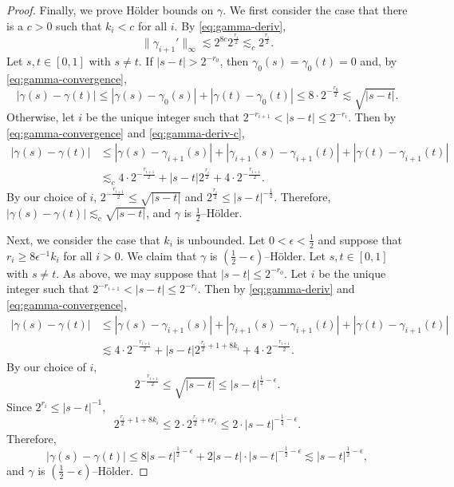 \documentclass[12pt,reqno]{amsart}
\theoremstyle{remark}
\newcommand{\0}{\mathbf{0}}
\renewcommand{\1}{\mathbf 1}
\begin{document}
\begin{proof}
  Finally, we prove Hölder bounds on $\gamma$. We first consider the case that there is a $c>0$ such that $k_i< c$ for all $i$. By \eqref{eq:gamma-deriv},
  \begin{equation}\label{eq:gamma-deriv-c}
    \|\gamma_{i+1}'\|_\infty \lesssim 2^{8c} 2^{\frac{r_i}{2}}\lesssim_c 2^{\frac{r_i}{2}}.
  \end{equation}
  Let $s,t\in [0,1]$ with $s\ne t$. If $|s-t| > 2^{-r_0}$, then $\gamma_0(s) = \gamma_0(t) = 0$ and, by \eqref{eq:gamma-convergence},
  $$|\gamma(s) - \gamma(t)| \le |\gamma(s) - \gamma_{0}(s)| + |\gamma(t) - \gamma_{0}(t)| \le 8 \cdot 2^{-\frac{r_0}{2}} \lesssim \sqrt{|s-t|}.$$
  Otherwise, let $i$ be the unique integer such that $2^{-r_{i+1}} < |s-t| \le 2^{-r_i}$. Then by \eqref{eq:gamma-convergence} and \eqref{eq:gamma-deriv-c},
  \begin{align*}
    |\gamma(s) - \gamma(t)| 
    &\le |\gamma(s) - \gamma_{i+1}(s)| + |\gamma_{i+1}(s) - \gamma_{i+1}(t)| + |\gamma(t) - \gamma_{i+1}(t)|\\ 
    &\lesssim_c 4\cdot 2^{-\frac{r_{i+1}}{2}} + |s-t| 2^{\frac{r_{i}}{2}} + 4\cdot 2^{-\frac{r_{i+1}}{2}}.
  \end{align*}
  By our choice of $i$, $2^{-\frac{r_{i+1}}{2}} \le \sqrt{|s-t|}$ and $2^{\frac{r_{i}}{2}} \le |s-t|^{-\frac{1}{2}}.$ Therefore, $|\gamma(s) - \gamma(t)| \lesssim_c \sqrt{|s-t|}$, and $\gamma$ is $\frac{1}{2}$--Hölder.

  Next, we consider the case that $k_i$ is unbounded. Let $0 < \epsilon <\frac{1}{2}$ and suppose that
  $r_i \ge 8\epsilon^{-1}k_i$
  for all $i> 0$. We claim that $\gamma$ is $(\frac{1}{2}-\epsilon)$--Hölder.
  Let $s,t\in [0,1]$ with $s\ne t$. As above, we may suppose that $|s-t| \le 2^{-r_0}$. Let $i$ be the unique integer such that $2^{-r_{i+1}} < |s-t| \le 2^{-r_i}$. Then by \eqref{eq:gamma-deriv} and \eqref{eq:gamma-convergence},
  \begin{align*}
    |\gamma(s) - \gamma(t)| 
    &\le |\gamma(s) - \gamma_{i+1}(s)| + |\gamma_{i+1}(s) - \gamma_{i+1}(t)| + |\gamma(t) - \gamma_{i+1}(t)|\\ 
    &\lesssim 4\cdot 2^{-\frac{r_{i+1}}{2}} + |s-t| 2^{\frac{r_i}{2} + 1 + 8k_i} + 4\cdot 2^{-\frac{r_{i+1}}{2}}.
  \end{align*}
  By our choice of $i$, 
  $$2^{-\frac{r_{i+1}}{2}} \le \sqrt{|s-t|}\le |s-t|^{\frac{1}{2} - \epsilon}.$$
  Since $2^{r_i}\le |s-t|^{-1}$, 
  $$2^{\frac{r_i}{2} + 1 + 8k_i} \le 2\cdot 2^{\frac{r_i}{2} + \epsilon r_i} \le 2 \cdot |s-t|^{-\frac{1}{2} - \epsilon}.$$
  Therefore,
  $$|\gamma(s) - \gamma(t)| \le 8 |s-t|^{\frac{1}{2} - \epsilon} + 2 |s-t| \cdot |s-t|^{-\frac{1}{2} - \epsilon} \lesssim |s-t|^{\frac{1}{2} - \epsilon},$$
  and $\gamma$ is $(\frac{1}{2}-\epsilon)$--Hölder.
\end{proof}
\end{document}
